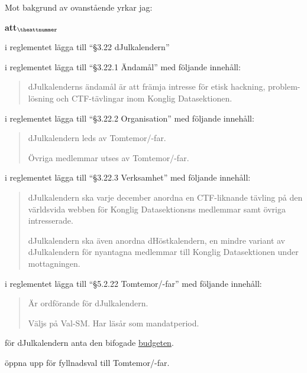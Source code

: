 \documentclass[a4paper]{article}
\begin{document}
	Mot bakgrund av ovanstående yrkar jag:

\setcounter{attnummer}{1}
\begin{list}{\bf att$_{\theattnummer}$}{}
    \item i reglementet lägga till ``§3.22 dJulkalendern''

    \item i reglementet lägga till ``§3.22.1 Ändamål'' med följande innehåll:
        \begin{quote}
            dJulkalenderns ändamål är att främja intresse för etisk hackning, problem-lösning och
            CTF-tävlingar inom Konglig Datasektionen.
        \end{quote}

    \item i reglementet lägga till ``§3.22.2 Organisation'' med följande innehåll:
        \begin{quote}
            dJulkalendern leds av Tomtemor/-far.

            Övriga medlemmar utses av Tomtemor/-far.
        \end{quote}

    \item i reglementet lägga till ``§3.22.3 Verksamhet'' med följande innehåll:
        \begin{quote}
            dJulkalendern ska varje december anordna en CTF-liknande tävling på den världsvida
            webben för Konglig Datasektionsns medlemmar samt övriga intresserade.

            dJulkalendern ska även anordna dHöstkalendern, en mindre variant av dJulkalendern för
            nyantagna medlemmar till Konglig Datasektionen under mottagningen.
        \end{quote}

    \item i reglementet lägga till ``§5.2.22 Tomtemor/-far'' med följande innehåll:
        \begin{quote}
            Är ordförande för dJulkalendern.

            Väljs på Val-SM. Har läsår som mandatperiod.
        \end{quote}

    \item för dJulkalendern anta den bifogade \hyperref[fig:budget]{budgeten}.

    \item öppna upp för fyllnadsval till Tomtemor/-far.
\end{list}
\end{document}
